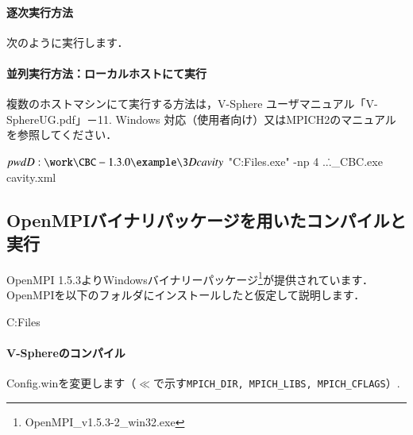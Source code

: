 \paragraph{逐次実行方法}
次のように実行します．


{\small
{}
}


\paragraph{並列実行方法：ローカルホストにて実行}
複数のホストマシンにて実行する方法は，V-Sphere ユーザマニュアル「V-SphereUG.pdf」－11. Windows 対応（使用者向け）又はMPICH2のマニュアルを参照してください．

{\small
\begin{program}
$ pwd
D:\work\CBC-1.3.0\example\3Dcavity
$ "C:\Program Files\bin\mpiexec.exe" -np 4 ..\..\src\PRJ_CBC\bin\sphere.exe cavity.xml
\end{program}
}


\hypertarget{tgt:win_opmi_binary}{\subsection{OpenMPIバイナリパッケージを用いたコンパイルと実行}}
OpenMPI 1.5.3よりWindowsバイナリーパッケージ\footnote{OpenMPI\_v1.5.3-2\_win32.exe}が提供されています．
OpenMPIを以下のフォルダにインストールしたと仮定して説明します．
{\small
\begin{program}
	C:\Program Files\OpenMPI
\end{program}
}

%
\paragraph{V-Sphereのコンパイル}
Config.winを変更します（$\ll$で示す\verb|MPICH_DIR, MPICH_LIBS, MPICH_CFLAGS|）.


